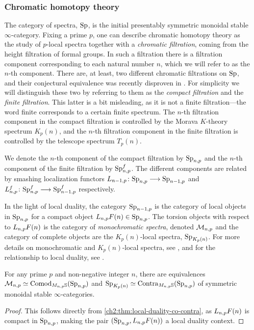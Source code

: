 \subsubsection*{Chromatic homotopy theory}

The category of spectra, $\mathrm{Sp}$, is the initial presentably symmetric monoidal stable $\infty$-category. Fixing a prime $p$, one can describe chromatic homotopy theory as the study of $p$-local spectra together with a \emph{chromatic filtration}, coming from the height filtration of formal groups. In such a filtration there is a filtration component corresponding to each natural number $n$, which we will refer to as the $n$-th component. There are, at least, two different chromatic filtrations on $\mathrm{Sp}$, and their conjectural equivalence was recently disproven in \cite{burklund-hahn-levy-schlank_23}. For simplicity we will distinguish these two by referring to them as the \emph{compact filtration} and the \emph{finite filtration}. This latter is a bit misleading, as it is not a finite filtration---the word finite corresponds to a certain finite spectrum. The $n$-th filtration component in the compact filtration is controlled by the Morava $K$-theory spectrum $K_p(n)$, and the $n$-th filtration component in the finite filtration is controlled by the telescope spectrum $T_p(n)$. 

We denote the $n$-th component of the compact filtration by $\mathrm{Sp}_{n,p}$ and the $n$-th component of the finite filtration by $\mathrm{Sp}_{n,p}^f$. The different components are related by smashing localization functors $L_{n-1,p}\colon\mathrm{Sp}_{n,p} \longrightarrow \mathrm{Sp}_{n-1,p}$ and $L_{n,p}^f\colon \mathrm{Sp}_{n,p}^f \longrightarrow \mathrm{Sp}_{n-1,p}^f$ respectively. 

In the light of local duality, the category $\mathrm{Sp}_{n-1,p}$ is the category of local objects in $\mathrm{Sp}_{n,p}$ for a compact object $L_{n,p} F(n) \in \mathrm{Sp}_{n,p}$. The torsion objects with respect to $L_{n,p} F(n)$ is the category of \emph{monochromatic spectra}, denoted $\mathcal{M}_{n,p}$ and the category of complete objects are the $K_p(n)$-local spectra, $\mathrm{Sp}_{K_p(n)}$. For more details on monochromatic and $K_p(n)$-local spectra, see \cite{hovey-strickland_99}, and for the relationship to local duality, see \cite[Section 6.2]{barthel-heard-valenzuela_2018}. 

\begin{proposition}
    For any prime $p$ and non-negative integer $n$, there are equivalences $\mathcal{M}_{n,p} \simeq \mathrm{Comod}_{M_{n,p}\mathbb{S}}(\mathrm{Sp}_{n,p})$ and $\mathrm{Sp}_{{K_p(n)}}\simeq \mathrm{Contra}_{M_{n,p}\mathbb{S}}(\mathrm{Sp}_{n,p})$ of symmetric monoidal stable $\infty$-categories. 
\end{proposition}
\begin{proof}
    This follows directly from \cref{ch2:thm:local-duality-co-contra}, as $L_{n,p} F(n)$ is compact in $\mathrm{Sp}_{n,p}$, making the pair $(\mathrm{Sp}_{n,p}, L_{n,p} F(n))$ a local duality context. 
\end{proof}

